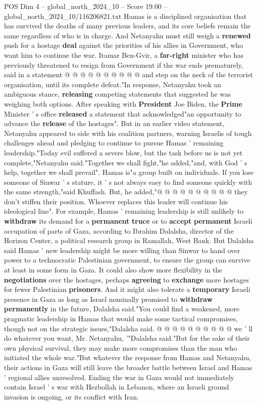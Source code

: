 \begin{textsample}{POS Dim 4 – global\_north\_2024\_10 – Score 19.00 – global\_north\_2024\_10/116206821.txt}
Hamas is a disciplined organisation that has survived the deaths of many previous leaders, and its core beliefs remain the same regardless of who is in charge.
And Netanyahu must still weigh a \textbf{renewed} push for a hostage \textbf{deal} against the priorities of his allies in Government, who want him to continue the war.
Itamar Ben-Gvir, a \textbf{far-right} minister who has previously threatened to resign from Government if the war ends prematurely, said in a statement @ @ @ @ @ @ @ @ @ @ and step on the neck of the terrorist organisation, until its complete defeat."In response, Netanyahu took an ambiguous stance, \textbf{releasing} competing statements that suggested he was weighing both options.
After speaking with \textbf{President} Joe Biden, the \textbf{Prime} Minister ' s office \textbf{released} a statement that acknowledged"an opportunity to advance the \textbf{release} of the hostages".
But in an earlier video statement, Netanyahu appeared to side with his coalition partners, warning Israelis of tough challenges ahead and pledging to continue to pursue Hamas ' remaining leadership."Today evil suffered a severe blow, but the task before us is not yet complete,"Netanyahu said."Together we shall fight,"he added,"and, with God ' s help, together we shall prevail".
Hamas is"a group built on individuals.
If you lose someone of Sinwar ' s stature, it ' s not always easy to find someone quickly with the same strength,"said Khuffash.
But, he added,"@ @ @ @ @ @ @ @ @ @ they don't stiffen their position.
Whoever replaces this leader will continue his ideological line".
For example, Hamas ' remaining leadership is still unlikely to \textbf{withdraw} its demand for a \textbf{permanent} \textbf{truce} or to \textbf{accept} \textbf{permanent} Israeli occupation of parts of Gaza, according to Ibrahim Dalalsha, director of the Horizon Center, a political research group in Ramallah, West Bank.
But Dalalsha said Hamas ' new leadership might be more willing than Sinwar to hand over power to a technocratic Palestinian government, to ensure the group can survive at least in some form in Gaza.
It could also show more flexibility in the \textbf{negotiations} over the hostages, perhaps \textbf{agreeing} to \textbf{exchange} more hostages for fewer Palestinian \textbf{prisoners}.
And it might also tolerate a \textbf{temporary} Israeli presence in Gaza as long as Israel nominally promised to \textbf{withdraw} \textbf{permanently} in the future, Dalalsha said."You could find a weakened, more pragmatic leadership in Hamas that would make some tactical compromises, though not on the strategic issues,"Dalalsha said. @ @ @ @ @ @ @ @ @ @ we ' ll do whatever you want, Mr.
Netanyahu, '"Dalalsha said."But for the sake of their own physical survival, they may make more compromises than the man who initiated the whole war."But whatever the response from Hamas and Netanyahu, their actions in Gaza will still leave the broader battle between Israel and Hamas ' regional allies unresolved.
Ending the war in Gaza would not immediately contain Israel ' s war with Hezbollah in Lebanon, where an Israeli ground invasion is ongoing, or its conflict with Iran.


\end{textsample}
